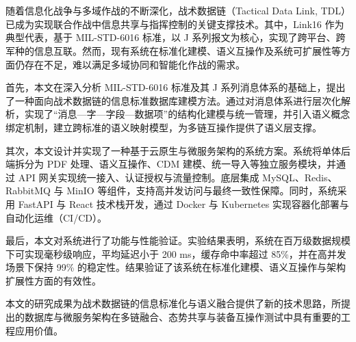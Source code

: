 \chapter*{\xiaosan{}}

随着信息化战争与多域作战的不断深化，战术数据链（Tactical Data Link, TDL）已成为实现联合作战中信息共享与指挥控制的关键支撑技术。其中，{Link16} 作为典型代表，基于 MIL-STD-6016 标准，以 J 系列报文为核心，实现了跨平台、跨军种的信息互联。然而，现有系统在标准化建模、语义互操作及系统可扩展性等方面仍存在不足，难以满足多域协同和智能化作战的需求。

首先，本文在深入分析 MIL-STD-6016 标准及其 J 系列消息体系的基础上，提出了一种面向战术数据链的信息标准数据库建模方法。通过对消息体系进行层次化解析，实现了“消息—字—字段—数据项”的结构化建模与统一管理，并引入语义概念绑定机制，建立跨标准的语义映射模型，为多链互操作提供了语义层支撑。

其次，本文设计并实现了一种基于云原生与微服务架构的系统方案。系统将单体后端拆分为 PDF 处理、语义互操作、CDM 建模、统一导入等独立服务模块，并通过 API 网关实现统一接入、认证授权与流量控制。底层集成 MySQL、Redis、RabbitMQ 与 MinIO 等组件，支持高并发访问与最终一致性保障。同时，系统采用 FastAPI 与 React 技术栈开发，通过 Docker 与 Kubernetes 实现容器化部署与自动化运维（CI/CD）。

最后，本文对系统进行了功能与性能验证。实验结果表明，系统在百万级数据规模下可实现毫秒级响应，平均延迟小于 200 ms，缓存命中率超过 85\%，并在高并发场景下保持 99\% 的稳定性。结果验证了该系统在标准化建模、语义互操作与架构扩展性方面的有效性。

本文的研究成果为战术数据链的信息标准化与语义融合提供了新的技术思路，所提出的数据库与微服务架构在多链融合、态势共享与装备互操作测试中具有重要的工程应用价值。

\vspace{0.5cm}
